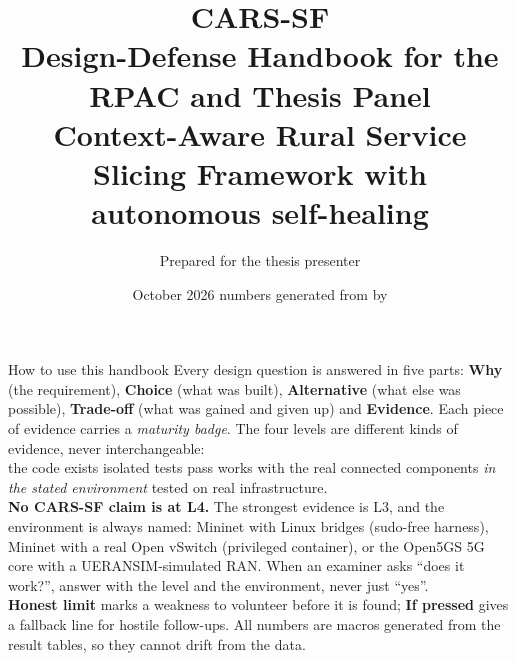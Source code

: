 \documentclass[10pt,a4paper]{article}
\title{\vspace{-1.2cm}\textbf{CARS-SF}\\[2pt]\large Design-Defense Handbook for the RPAC and Thesis Panel\\[2pt]
\normalsize Context-Aware Rural Service Slicing Framework with autonomous self-healing}
\author{Prepared for the thesis presenter}
\date{October 2026 \textperiodcentered{} numbers generated from \code{results/} by \code{experiments/defense_numbers.py}}
\begin{document}
\maketitle
\thispagestyle{empty}

\begin{keybox}{How to use this handbook}
Every design question is answered in five parts:
\textbf{Why} (the requirement), \textbf{Choice} (what was built), \textbf{Alternative} (what else was possible),
\textbf{Trade-off} (what was gained and given up) and \textbf{Evidence}. Each piece of evidence carries a
\emph{maturity badge}. The four levels are different kinds of evidence, never interchangeable:\\[2pt]
\Lone{} the code exists \quad \Ltwo{} isolated tests pass \quad
\Lthree{} works with the real connected components \emph{in the stated environment} \quad
\Lfour{} tested on real infrastructure.\\[2pt]
\textbf{No CARS-SF claim is at L4.} The strongest evidence is L3, and the environment is always named:
Mininet with Linux bridges (sudo-free harness), Mininet with a real Open vSwitch (privileged container), or
the Open5GS 5G core with a UERANSIM-simulated RAN. When an examiner asks ``does it work?'', answer with the
level and the environment, never just ``yes''.\\[2pt]
\textcolor{cH}{\textbf{Honest limit}} marks a weakness to volunteer before it is found; \textbf{If pressed} gives a fallback line for hostile follow-ups.
All numbers are macros generated from the result tables, so they cannot drift from the data.
\end{keybox}

\FigLadder
\end{document}
